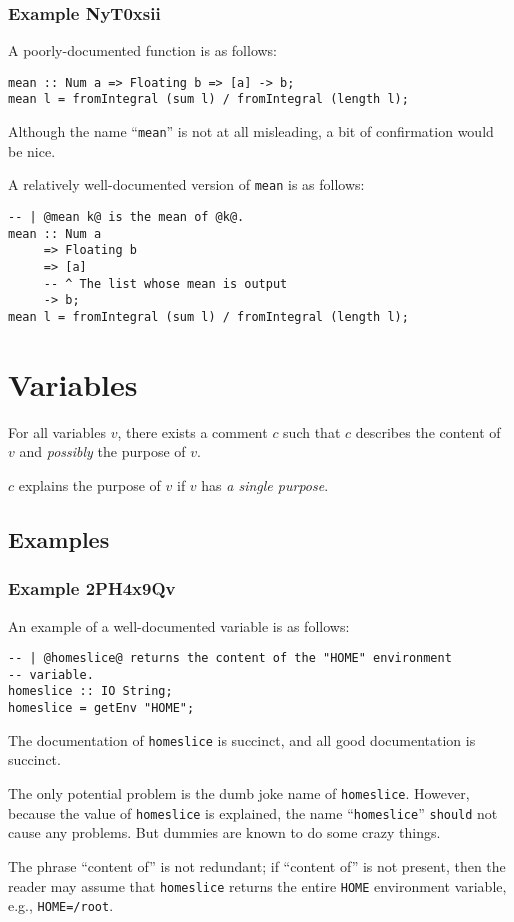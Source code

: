 \documentclass{report}
\begin{document}
\subsubsection{Example NyT0xsii}
A poorly-documented function is as follows:
\begin{lstlisting}
mean :: Num a => Floating b => [a] -> b;
mean l = fromIntegral (sum l) / fromIntegral (length l);
\end{lstlisting}
Although the name ``\texttt{mean}'' is not at all misleading, a bit of confirmation would be nice.

A relatively well-documented version of \texttt{mean} is as follows:
\begin{lstlisting}
-- | @mean k@ is the mean of @k@.
mean :: Num a
     => Floating b
     => [a]
     -- ^ The list whose mean is output
     -> b;
mean l = fromIntegral (sum l) / fromIntegral (length l);
\end{lstlisting}
\section{Variables}
For all variables $v$, there exists a comment $c$ such that $c$ describes the content of $v$ and \textit{possibly} the purpose of $v$.

$c$ explains the purpose of $v$ if $v$ has \textit{a single purpose}.
\subsection{Examples}
\subsubsection{Example 2PH4x9Qv}
An example of a well-documented variable is as follows:
\begin{lstlisting}
-- | @homeslice@ returns the content of the "HOME" environment
-- variable.
homeslice :: IO String;
homeslice = getEnv "HOME";
\end{lstlisting}
The documentation of \texttt{homeslice} is succinct, and all good documentation is succinct.

The only potential problem is the dumb joke name of \texttt{homeslice}.  However, because the value of \texttt{homeslice} is explained, the name ``\texttt{homeslice}'' \texttt{should} not cause any problems.  But dummies are known to do some crazy things.

The phrase ``content of'' is not redundant; if ``content of'' is not present, then the reader may assume that \texttt{homeslice} returns the entire \texttt{HOME} environment variable, e.g., \texttt{HOME=/root}.
\end{document}
